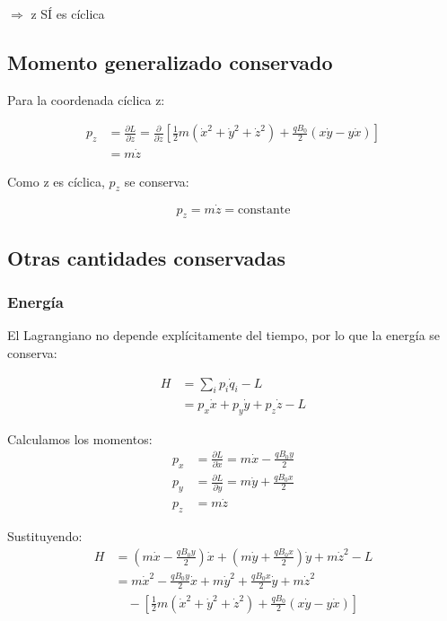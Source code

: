 \documentclass{article}
\begin{document}
$\Rightarrow$ z SÍ es cíclica

\subsection*{Momento generalizado conservado}

Para la coordenada cíclica z:

\begin{align}
p_z &= \frac{\partial L}{\partial \dot{z}} = \frac{\partial}{\partial \dot{z}}\left[\frac{1}{2}m(\dot{x}^2 + \dot{y}^2 + \dot{z}^2) + \frac{qB_0}{2}(x\dot{y} - y\dot{x})\right] \\
&= m\dot{z}
\end{align}

Como z es cíclica, $p_z$ se conserva:

\begin{equation}
\boxed{p_z = m\dot{z} = \text{constante}}
\end{equation}

\subsection*{Otras cantidades conservadas}

\subsubsection*{Energía}

El Lagrangiano no depende explícitamente del tiempo, por lo que la energía se conserva:

\begin{align}
H &= \sum_i p_i \dot{q}_i - L \\
&= p_x \dot{x} + p_y \dot{y} + p_z \dot{z} - L
\end{align}

Calculamos los momentos:
\begin{align}
p_x &= \frac{\partial L}{\partial \dot{x}} = m\dot{x} - \frac{qB_0 y}{2} \\
p_y &= \frac{\partial L}{\partial \dot{y}} = m\dot{y} + \frac{qB_0 x}{2} \\
p_z &= m\dot{z}
\end{align}

Sustituyendo:
\begin{align}
H &= \left(m\dot{x} - \frac{qB_0 y}{2}\right)\dot{x} + \left(m\dot{y} + \frac{qB_0 x}{2}\right)\dot{y} + m\dot{z}^2 - L \\
&= m\dot{x}^2 - \frac{qB_0 y}{2}\dot{x} + m\dot{y}^2 + \frac{qB_0 x}{2}\dot{y} + m\dot{z}^2 \\
&\quad - \left[\frac{1}{2}m(\dot{x}^2 + \dot{y}^2 + \dot{z}^2) + \frac{qB_0}{2}(x\dot{y} - y\dot{x})\right]
\end{align}
\end{document}
